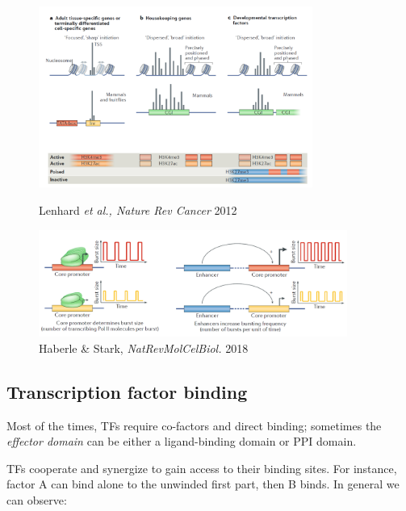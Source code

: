 \begin{figure}[!htb]
   \begin{minipage}{0.48\textwidth}
     \centering
   \includegraphics[width=0.8\textwidth]{../_resources/Screenshot_2022-10-05_at_10-05-59.png}
\caption{Lenhard \emph{et al., Nature Rev Cancer} 2012}
\label{fig:types}
   \end{minipage}\hfill
   \begin{minipage}{0.48\textwidth}
     \centering
 \includegraphics[width=0.9\textwidth]{../_resources/Screenshot_2022-10-10_at_10-50-43.png}
\caption{Haberle \& Stark, \emph{NatRevMolCelBiol.} 2018}
\label{fig:burst}
   \end{minipage}
\end{figure}

\hypertarget{transcription-factor-binding}{%
\subsection{Transcription factor binding}\label{transcription-factor-binding}}

Most of the times, TFs require co-factors and direct binding; sometimes the \emph{effector domain} can be either a ligand-binding domain or PPI domain.

TFs cooperate and synergize to gain access to their binding sites. For instance, factor A can bind alone to the unwinded first part, then B binds. In general we can observe:


